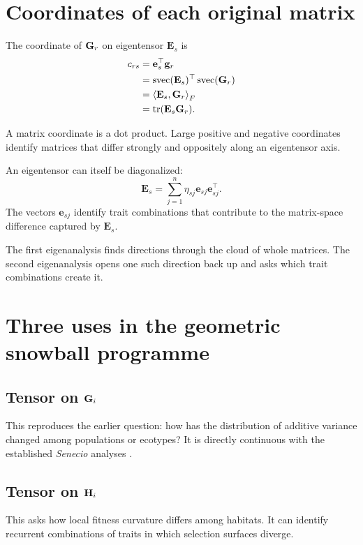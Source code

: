 \section{Coordinates of each original matrix}

The coordinate of \(\mathbf{G}_r\) on eigentensor \(\mathbf E_s\) is
\begin{align}
c_{rs}
&=\mathbf e_s^\top\mathbf g_r\\
&=\operatorname{svec}(\mathbf E_s)^\top\operatorname{svec}(\mathbf{G}_r)\\
&=\left\langle \mathbf E_s,\mathbf{G}_r\right\rangle_F\\
&=\operatorname{tr}(\mathbf E_s\mathbf{G}_r).
\label{eq:eigentensorCoordinate}
\end{align}

\inwords A matrix coordinate is a dot product. Large positive and negative coordinates identify matrices that differ strongly and oppositely along an eigentensor axis.

An eigentensor can itself be diagonalized:
\begin{equation}
\mathbf E_s=\sum_{j=1}^n\eta_{sj}\mathbf e_{sj}\mathbf e_{sj}^\top.
\end{equation}
The vectors \(\mathbf e_{sj}\) identify trait combinations that contribute to the matrix-space difference captured by \(\mathbf E_s\).

\begin{geombox}
The first eigenanalysis finds directions through the cloud of whole matrices. The second eigenanalysis opens one such direction back up and asks which trait combinations create it.
\end{geombox}

\section{Three uses in the geometric snowball programme}

\subsection{Tensor on \(\mathbf{G}_i\)}
This reproduces the earlier question: how has the distribution of additive variance changed among populations or ecotypes? It is directly continuous with the established \textit{Senecio} analyses \cite{walter2018,aguirre2014,hine2009}.

\subsection{Tensor on \(\mathbf{H}_i\)}
This asks how local fitness curvature differs among habitats. It can identify recurrent combinations of traits in which selection surfaces diverge.


